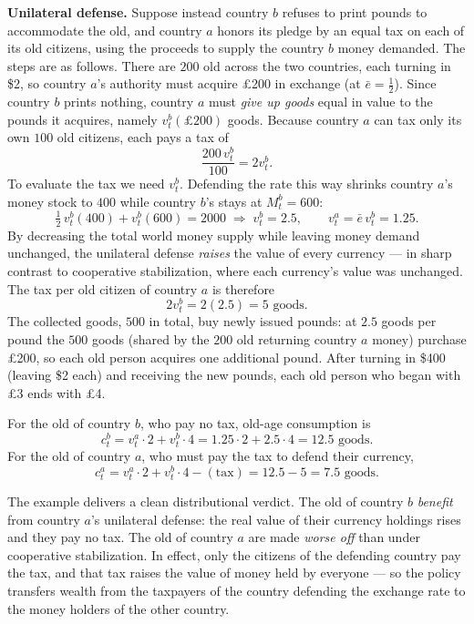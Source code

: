 {\medskip\noindent\textbf{Unilateral defense.} Suppose instead country $b$ refuses to print pounds to accommodate the old, and country $a$ honors its pledge by an equal tax on each of its old citizens, using the proceeds to supply the country $b$ money demanded. The steps are as follows. There are $200$ old across the two countries, each turning in \$2, so country $a$'s authority must acquire \pounds200 in exchange (at $\bar e = \tfrac12$). Since country $b$ prints nothing, country $a$ must \emph{give up goods} equal in value to the pounds it acquires, namely $v_t^b(\pounds200)$ goods. Because country $a$ can tax only its own $100$ old citizens, each pays a tax of
\[
\frac{200\, v_t^b}{100} = 2 v_t^b.
\]
To evaluate the tax we need $v_t^b$. Defending the rate this way shrinks country $a$'s money stock to $400$ while country $b$'s stays at $M_t^b = 600$:
\[
\tfrac12\, v_t^b (400) + v_t^b (600) = 2000
\;\Longrightarrow\; v_t^b = 2.5,
\qquad v_t^a = \bar e\, v_t^b = 1.25.
\]
By decreasing the total world money supply while leaving money demand unchanged, the unilateral defense \emph{raises} the value of every currency --- in sharp contrast to cooperative stabilization, where each currency's value was unchanged. The tax per old citizen of country $a$ is therefore
\[
2 v_t^b = 2(2.5) = 5 \text{ goods}.
\]
The collected goods, $500$ in total, buy newly issued pounds: at $2.5$ goods per pound the $500$ goods (shared by the $200$ old returning country $a$ money) purchase \pounds200, so each old person acquires one additional pound. After turning in \$400 (leaving \$2 each) and receiving the new pounds, each old person who began with \pounds3 ends with \pounds4.

For the old of country $b$, who pay no tax, old-age consumption is
\[
c_t^b = v_t^a \cdot 2 + v_t^b \cdot 4 = 1.25 \cdot 2 + 2.5 \cdot 4 = 12.5 \text{ goods}.
\]
For the old of country $a$, who must pay the tax to defend their currency,
\[
c_t^a = v_t^a \cdot 2 + v_t^b \cdot 4 - (\text{tax}) = 12.5 - 5 = 7.5 \text{ goods}.
\]
}

The example delivers a clean distributional verdict. The old of country $b$ \emph{benefit} from country $a$'s unilateral defense: the real value of their currency holdings rises and they pay no tax. The old of country $a$ are made \emph{worse off} than under cooperative stabilization. In effect, only the citizens of the defending country pay the tax, and that tax raises the value of money held by everyone --- so the policy transfers wealth from the taxpayers of the country defending the exchange rate to the money holders of the other country.

